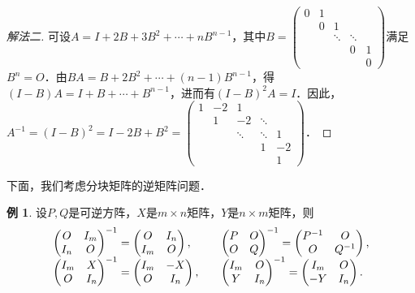 \documentclass[a4paper,fontset=windows]{ctexbook}
\theoremstyle{definition}
\newtheorem{example}{例}[chapter]
\begin{document}
\begin{proof}[解法二]
可设$A=I+2B+3B^2+\cdots+nB^{n-1}$，其中$B=\begin{pmatrix}0&1&&& \\ &0&1&& \\ &&\ddots&\ddots& \\ &&&0&1 \\ &&&&0\end{pmatrix}$满足$B^n=O$．由$BA=B+2B^2+\cdots+(n-1)B^{n-1}$，得$(I-B)A=I+B+\cdots+B^{n-1}$，进而有$(I-B)^2A=I$．因此，
$A^{-1}=(I-B)^2=I-2B+B^2=\begin{pmatrix}1&-2&1&& \\ &1&-2&\ddots& \\ &&\ddots&\ddots&1 \\ &&&1&-2 \\ &&&&1\end{pmatrix}$．
\end{proof}

下面，我们考虑分块矩阵的逆矩阵问题．

\begin{example}
设$P,Q$是可逆方阵，$X$是$m\times n$矩阵，$Y$是$n\times m$矩阵，则
$$\begin{array}{l@{\qquad}l}
\begin{pmatrix}O&I_m \\ I_n&O\end{pmatrix}^{-1}=\begin{pmatrix}O&I_n \\ I_m&O\end{pmatrix},
&\begin{pmatrix}P&O \\ O&Q\end{pmatrix}^{-1}=\begin{pmatrix}P^{-1}&O\\ O&Q^{-1}\end{pmatrix}, \\
\begin{pmatrix}I_m&X \\ O&I_n\end{pmatrix}^{-1}=\begin{pmatrix}I_m&-X \\ O&I_n\end{pmatrix},
&\begin{pmatrix}I_m&O \\ Y&I_n\end{pmatrix}^{-1}=\begin{pmatrix}I_m&O \\ -Y&I_n\end{pmatrix}.
\end{array}$$
\end{example}
\end{document}
